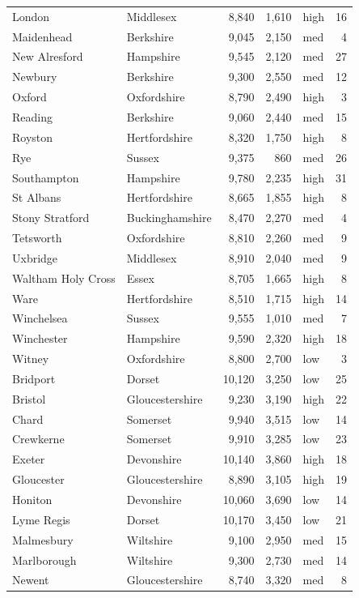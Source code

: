 \documentclass[11pt,a4paper]{article}
\begin{document}
{\begin{longtable}{p{5.4cm}p{4.2cm}rrlr}
London & Middlesex & 8,840 & 1,610 & high & 16\\
Maidenhead & Berkshire & 9,045 & 2,150 & med & 4\\
New Alresford & Hampshire & 9,545 & 2,120 & med & 27\\
Newbury & Berkshire & 9,300 & 2,550 & med & 12\\
Oxford & Oxfordshire & 8,790 & 2,490 & high & 3\\
Reading & Berkshire & 9,060 & 2,440 & med & 15\\
Royston & Hertfordshire & 8,320 & 1,750 & high & 8\\
Rye & Sussex & 9,375 & 860 & med & 26\\
Southampton & Hampshire & 9,780 & 2,235 & high & 31\\
St Albans & Hertfordshire & 8,665 & 1,855 & high & 8\\
Stony Stratford & Buckinghamshire & 8,470 & 2,270 & med & 4\\
Tetsworth & Oxfordshire & 8,810 & 2,260 & med & 9\\
Uxbridge & Middlesex & 8,910 & 2,040 & med & 9\\
Waltham Holy Cross & Essex & 8,705 & 1,665 & high & 8\\
Ware & Hertfordshire & 8,510 & 1,715 & high & 14\\
Winchelsea & Sussex & 9,555 & 1,010 & med & 7\\
Winchester & Hampshire & 9,590 & 2,320 & high & 18\\
Witney & Oxfordshire & 8,800 & 2,700 & low & 3\\
Bridport & Dorset & 10,120 & 3,250 & low & 25\\
Bristol & Gloucestershire & 9,230 & 3,190 & high & 22\\
Chard & Somerset & 9,940 & 3,515 & low & 14\\
Crewkerne & Somerset & 9,910 & 3,285 & low & 23\\
Exeter & Devonshire & 10,140 & 3,860 & high & 18\\
Gloucester & Gloucestershire & 8,890 & 3,105 & high & 19\\
Honiton & Devonshire & 10,060 & 3,690 & low & 14\\
Lyme Regis & Dorset & 10,170 & 3,450 & low & 21\\
Malmesbury & Wiltshire & 9,100 & 2,950 & med & 15\\
Marlborough & Wiltshire & 9,300 & 2,730 & med & 14\\
Newent & Gloucestershire & 8,740 & 3,320 & med & 8\\

\end{longtable}}
\end{document}
